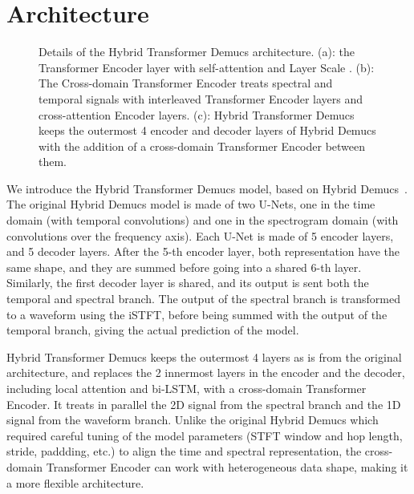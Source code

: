 \documentclass{article}
\begin{document}
\section{Architecture}
\label{sec:architecture}

\begin{figure*}[h]
    \centering
    \qquad
    \qquad
    \caption{Details of the Hybrid Transformer Demucs architecture. (a): the Transformer Encoder layer
        with self-attention and Layer Scale \cite{layerscale}. (b): The Cross-domain Transformer Encoder treats spectral and temporal signals with interleaved Transformer Encoder layers and cross-attention Encoder layers. (c): Hybrid Transformer Demucs keeps the outermost 4 encoder and decoder layers of Hybrid Demucs with the addition of a cross-domain Transformer Encoder between them.}
    \label{fig:architecture}\end{figure*}

We introduce the Hybrid Transformer Demucs model, based on Hybrid Demucs~\cite{defossez2021hybrid}.
The original Hybrid Demucs model is made of two U-Nets, one in the time domain (with temporal convolutions) and
one in the spectrogram domain (with convolutions over the frequency axis). 
Each U-Net is made of 5 encoder layers, and 5 decoder layers. After the 5-th encoder layer, both representation
have the same shape, and they are summed before going into a shared 6-th layer. Similarly, the first decoder layer is shared, and
its output is sent both the temporal and spectral branch. The output of the spectral branch
is transformed to a waveform using the iSTFT, before being summed with the output of the temporal branch, giving the 
actual prediction of the model.

Hybrid Transformer Demucs keeps the outermost 4 layers as is from the original architecture, and replaces the 2 innermost layers in the encoder and the decoder, including local attention and bi-LSTM, with
a cross-domain Transformer Encoder.
It treats in parallel the 2D signal from the spectral branch and the 1D signal from the waveform branch. 
Unlike the original Hybrid Demucs which required careful tuning of the model parameters (STFT window and hop length, stride, paddding, etc.) to align the time and spectral representation, the cross-domain
Transformer Encoder can work with heterogeneous data shape, making it a more flexible architecture.
\end{document}
